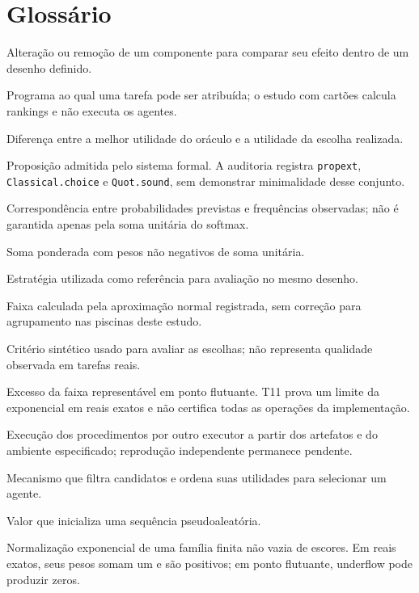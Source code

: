 \documentclass[12pt,openany,oneside,a4paper,brazil,chapter=TITLE]{abntex2}
\begin{document}
\chapter*{Glossário}\label{ap:glossario}
\begin{description}[style=nextline,leftmargin=0pt,labelindent=0pt]
\item[Ablação.] Alteração ou remoção de um componente para comparar seu efeito dentro de um desenho definido.
\item[Agente.] Programa ao qual uma tarefa pode ser atribuída; o estudo com cartões calcula rankings e não executa os agentes.
\item[Arrependimento.] Diferença entre a melhor utilidade do oráculo e a utilidade da escolha realizada.
\item[Axioma.] Proposição admitida pelo sistema formal. A auditoria registra \texttt{propext}, \texttt{Classical.choice} e \texttt{Quot.sound}, sem demonstrar minimalidade desse conjunto.
\item[Calibração probabilística.] Correspondência entre probabilidades previstas e frequências observadas; não é garantida apenas pela soma unitária do softmax.
\item[Combinação convexa.] Soma ponderada com pesos não negativos de soma unitária.
\item[Comparador.] Estratégia utilizada como referência para avaliação no mesmo desenho.
\item[Intervalo exploratório.] Faixa calculada pela aproximação normal registrada, sem correção para agrupamento nas piscinas deste estudo.
\item[Oráculo.] Critério sintético usado para avaliar as escolhas; não representa qualidade observada em tarefas reais.
\item[Overflow.] Excesso da faixa representável em ponto flutuante. T11 prova um limite da exponencial em reais exatos e não certifica todas as operações da implementação.
\item[Reprodução.] Execução dos procedimentos por outro executor a partir dos artefatos e do ambiente especificado; reprodução independente permanece pendente.
\item[Roteador.] Mecanismo que filtra candidatos e ordena suas utilidades para selecionar um agente.
\item[Semente.] Valor que inicializa uma sequência pseudoaleatória.
\item[Softmax.] Normalização exponencial de uma família finita não vazia de escores. Em reais exatos, seus pesos somam um e são positivos; em ponto flutuante, underflow pode produzir zeros.

\end{description}
\end{document}
